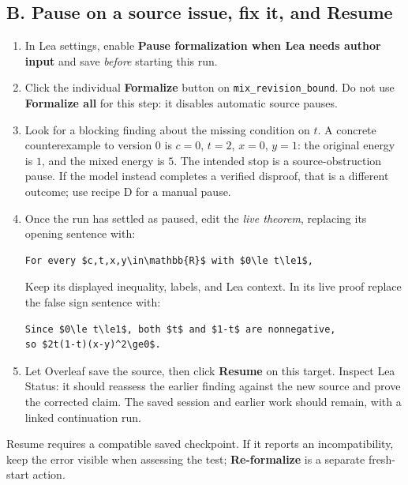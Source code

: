 \documentclass[11pt]{article}
\newcommand{\code}[1]{\texttt{#1}}
\begin{document}
\subsection*{B. Pause on a source issue, fix it, and Resume}
\begin{enumerate}
 \item In Lea settings, enable \textbf{Pause formalization when Lea needs
   author input} and save \emph{before} starting this run.
 \item Click the individual \textbf{Formalize} button on
   \code{mix\_revision\_bound}. Do not use \textbf{Formalize all} for this
   step: it disables automatic source pauses.
 \item Look for a blocking finding about the missing condition on $t$.
   A concrete counterexample to version 0 is $c=0$, $t=2$, $x=0$, $y=1$:
   the original energy is $1$, and the mixed energy is $5$.
   The intended stop is a source-obstruction pause. If the model instead
   completes a verified disproof, that is a different outcome; use recipe D
   for a manual pause.
 \item Once the run has settled as paused, edit the \emph{live theorem},
   replacing its opening sentence with:
\begin{verbatim}
For every $c,t,x,y\in\mathbb{R}$ with $0\le t\le1$,
\end{verbatim}
   Keep its displayed inequality, labels, and Lea context. In its live
   proof replace the false sign sentence with:
\begin{verbatim}
Since $0\le t\le1$, both $t$ and $1-t$ are nonnegative,
so $2t(1-t)(x-y)^2\ge0$.
\end{verbatim}
 \item Let Overleaf save the source, then click \textbf{Resume} on this
   target. Inspect Lea Status: it should reassess the earlier finding
   against the new source and prove the corrected claim. The saved session
   and earlier work should remain, with a linked continuation run.
\end{enumerate}
\noindent Resume requires a compatible saved checkpoint. If it reports an
incompatibility, keep the error visible when assessing the test;
\textbf{Re-formalize} is a separate fresh-start action.
\end{document}
